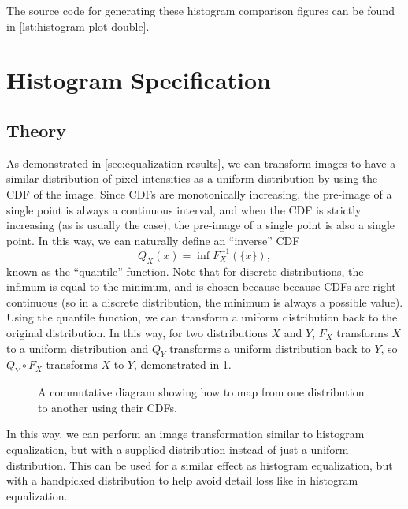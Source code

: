 \documentclass[headings=optiontoheadandtoc,listof=totoc,parskip=full]{scrartcl}
\begin{document}
The source code for generating these histogram comparison figures can be found in \cref{lst:histogram-plot-double}.

\section{Histogram Specification}
\label{sec:specification}

\subsection{Theory}
As demonstrated in \cref{sec:equalization-results}, we can transform images to have a similar distribution of pixel intensities as a uniform distribution by using the CDF of the image. Since CDFs are monotonically increasing, the pre-image of a single point is always a continuous interval, and when the CDF is strictly increasing (as is usually the case), the pre-image of a single point is also a single point. In this way, we can naturally define an ``inverse'' CDF
\begin{equation}
	Q_X(x) = \inf F_X^{-1}(\{x\}), \label{eq:quantile-func}
\end{equation}
known as the ``quantile'' function. Note that for discrete distributions, the infimum is equal to the minimum, and is chosen because because CDFs are right-continuous (so in a discrete distribution, the minimum is always a possible value). Using the quantile function, we can transform a uniform distribution back to the original distribution. In this way, for two distributions $X$ and $Y$, $F_X$ transforms $X$ to a uniform distribution and $Q_Y$ transforms a uniform distribution back to $Y$, so $Q_Y \circ F_X$ transforms $X$ to $Y$, demonstrated in  \cref{fig:specification-cd}.

\begin{figure}[H]
	\centering
	\caption{A commutative diagram showing how to map from one distribution to another using their CDFs.}
	\label{fig:specification-cd}
\end{figure}

In this way, we can perform an image transformation similar to histogram equalization, but with a supplied distribution instead of just a uniform distribution. This can be used for a similar effect as histogram equalization, but with a handpicked distribution to help avoid detail loss like in histogram equalization.\par
\end{document}
